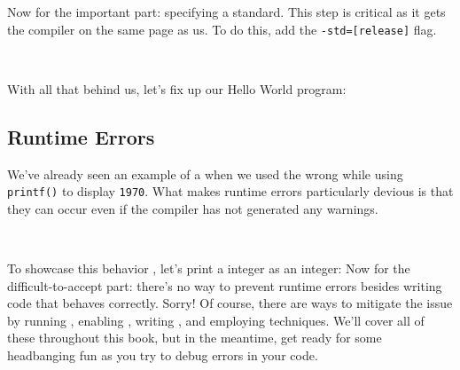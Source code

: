 Now for the important part: specifying a standard.  This step is
critical as it gets the compiler on the same page as us.  To do this,
add the \texttt{-std=[release]} flag.

\

\noindent
With all that behind us, let's fix up our Hello World program:

\subsection{Runtime Errors}

We've already seen an example of a  when we used
the wrong  while using \texttt{printf()}
to display \texttt{1970}.  What makes runtime errors particularly
devious is that they can occur even if the compiler has not generated
any warnings.

\

\noindent
To showcase this behavior , let's print a  integer as an
 integer:
\noindent
Now for the difficult-to-accept part: there's no way to prevent runtime
errors besides writing code that behaves correctly.  Sorry!  Of course,
there are ways to mitigate the issue by running , enabling , writing , and employing  techniques.  We'll
cover all of these throughout this book, but in the meantime, get ready
for some headbanging fun as you try to debug errors in your code.
